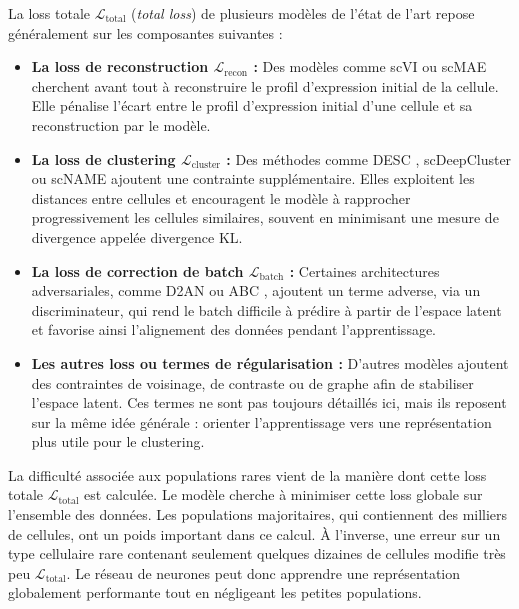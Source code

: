 La loss totale \(\mathcal{L}_{\mathrm{total}}\) (\textit{total loss}) de plusieurs modèles de l'état de l'art repose généralement sur les composantes suivantes :
\begin{itemize}
    \item \textbf{La loss de reconstruction \(\mathcal{L}_{\mathrm{recon}}\) :} Des modèles comme scVI \cite{Lopez2018scVI} ou scMAE \cite{Fang2024scMAE} cherchent avant tout à reconstruire le profil d'expression initial de la cellule. Elle pénalise l'écart entre le profil d'expression initial d'une cellule et sa reconstruction par le modèle.
    \item \textbf{La loss de clustering \(\mathcal{L}_{\mathrm{cluster}}\) :} Des méthodes comme DESC \cite{li2020deep}, scDeepCluster \cite{tian2019clustering} ou scNAME \cite{wan_scname_2022} ajoutent une contrainte supplémentaire. Elles exploitent les distances entre cellules et encouragent le modèle à rapprocher progressivement les cellules similaires, souvent en minimisant une mesure de divergence appelée divergence KL.
    \item \textbf{La loss de correction de batch \(\mathcal{L}_{\mathrm{batch}}\) :} Certaines architectures adversariales, comme D2AN \cite{zhu2024d2an} ou ABC \cite{danino2024abc}, ajoutent un terme adverse, via un discriminateur, qui rend le batch difficile à prédire à partir de l'espace latent et favorise ainsi l'alignement des données pendant l'apprentissage.
    \item \textbf{Les autres loss ou termes de régularisation :} D'autres modèles ajoutent des contraintes de voisinage, de contraste ou de graphe afin de stabiliser l'espace latent. Ces termes ne sont pas toujours détaillés ici, mais ils reposent sur la même idée générale : orienter l'apprentissage vers une représentation plus utile pour le clustering.
\end{itemize}

La difficulté associée aux populations rares vient de la manière dont cette loss totale \(\mathcal{L}_{\mathrm{total}}\) est calculée. Le modèle cherche à minimiser cette loss globale sur l'ensemble des données. Les populations majoritaires, qui contiennent des milliers de cellules, ont un poids important dans ce calcul. À l'inverse, une erreur sur un type cellulaire rare contenant seulement quelques dizaines de cellules modifie très peu \(\mathcal{L}_{\mathrm{total}}\). Le réseau de neurones peut donc apprendre une représentation globalement performante tout en négligeant les petites populations.

